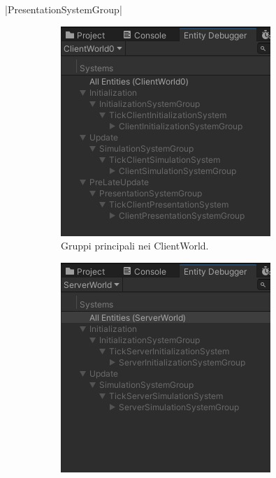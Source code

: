 |PresentationSystemGroup|

\begin{figure}[!ht]
    \begin{subfigure}{.49\textwidth}
      \centering
      \includegraphics[width=.95\linewidth]{gfx/imgs/chapter3/SystemGroupClientNetCode.png}
      \caption{Gruppi principali nei ClientWorld.}
      \label{fig:client-world-groups}
    \end{subfigure}
    \begin{subfigure}{.49\textwidth}
      \centering
      \includegraphics[width=.95\linewidth]{gfx/imgs/chapter3/SystemGroupServerNetCode.png}

\end{subfigure}
\end{figure}
